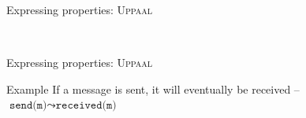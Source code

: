 \documentclass[aspectratio=169]{beamer}
\begin{document}


\begin{slide}{Expressing properties: \textsc{Uppaal}}
\small \centering

~
~~~~~
~

\end{slide}





\begin{slide}{Expressing properties: \textsc{Uppaal}}
\small \centering



\begin{exampleblock}{Example}
  If a message is sent, it will eventually be received -- $\texttt{send(m)} \leadsto \texttt{received(m)}$
\end{exampleblock}

\end{slide}
\end{document}
